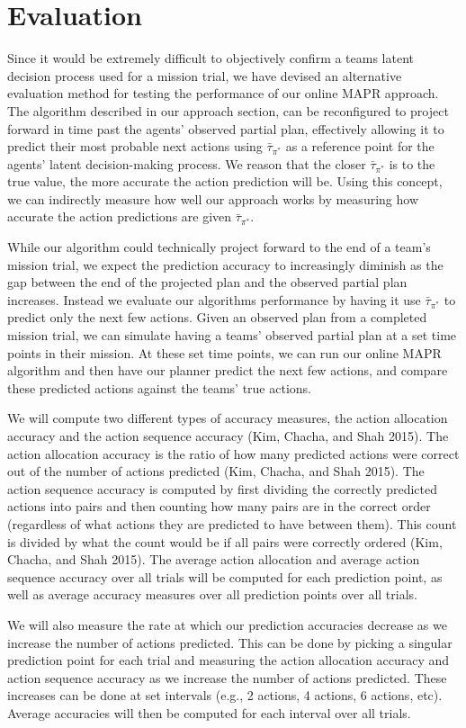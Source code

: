 \section{Evaluation}
Since it would be extremely difficult to objectively confirm a teams latent decision process used for a mission trial, we have devised an alternative evaluation method for testing the performance of our online MAPR approach. The algorithm described in our approach section, can be reconfigured to project forward in time past the agents' observed partial plan, effectively allowing it to predict their most probable next actions using $\bar{\tau}_{\pi^*}$ as a reference point for the agents' latent decision-making process. We reason that the closer $\bar{\tau}_{\pi^*}$ is to the true value, the more accurate the action prediction will be. Using this concept, we can indirectly measure how well our approach works by measuring how accurate the action predictions are given $\bar{\tau}_{\pi^*}$.

While our algorithm could technically project forward to the end of a team's mission trial, we expect the prediction accuracy to increasingly diminish as the gap between the end of the projected plan and the observed partial plan increases. Instead we evaluate our algorithms performance by having it use $\bar{\tau}_{\pi^*}$ to predict only the next few actions. Given an observed plan from a completed mission trial, we can simulate having a teams' observed partial plan at a set time points in their mission. At these set time points, we can run our online MAPR algorithm and then have our planner predict the next few actions, and compare these predicted actions against the teams' true actions. 

We will compute two different types of accuracy measures, the action allocation accuracy and the action sequence accuracy (Kim, Chacha, and Shah 2015). The action allocation accuracy is the ratio of how many predicted actions were correct out of the number of actions predicted (Kim, Chacha, and Shah 2015). The action sequence accuracy is computed by first dividing the correctly predicted actions into pairs and then counting how many pairs are in the correct order (regardless of what actions they are predicted to have between them). This count is divided by what the count would be if all pairs were correctly ordered (Kim, Chacha, and Shah 2015). The average action allocation and average action sequence accuracy over all trials will be computed for each prediction point, as well as average accuracy measures over all prediction points over all trials. 

We will also measure the rate at which our prediction accuracies decrease as we increase the number of actions predicted. This can be done by picking a singular prediction point for each trial and measuring the action allocation accuracy and action sequence accuracy as we increase the number of actions predicted. These increases can be done at set intervals (e.g., 2 actions, 4 actions, 6 actions, etc).  Average accuracies will then be computed for each interval over all trials. 